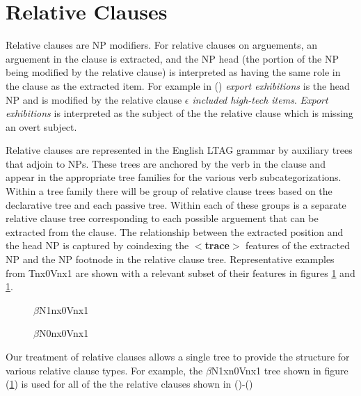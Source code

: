 \section{Relative Clauses}
\label{rel_clauses}

Relative clauses are NP modifiers. For relative clauses on arguements,
an arguement in the clause is extracted, and the NP head (the
portion of the NP being modified by the relative clause) is
interpreted as having the same role in the clause as the extracted
item.  For example in () {\it export exhibitions} is the head NP
and is modified by the relative clause {\it $\epsilon$ included high-tech
items}. {\it Export exhibitions} is interpreted as the subject of the
the relative clause which is missing an overt subject.


Relative clauses are represented in the English LTAG grammar by
auxiliary trees that adjoin to NPs. These trees are anchored by the
verb in the clause and appear in the appropriate tree families for the
various verb subcategorizations. Within a tree family there will be
group of relative clause trees based on the declarative tree and each
passive tree. Within each of these groups is a separate relative
clause tree corresponding to each possible arguement that can be
extracted from the clause. The relationship between the extracted
position and the head NP is captured by coindexing the {\bf
$<$trace$>$} features of the extracted NP and the NP footnode in the
relative clause tree.  Representative examples from
Tnx0Vnx1 are shown with a relevant subset
of their features in figures \ref{betaN1nx0Vnx1} and
\ref{betaN1nx0Vnx1}.

\begin{figure}[htbp]
\caption{ \label{betaN1nx0Vnx1} $\beta$N1nx0Vnx1}
\end{figure}

\begin{figure}[htbp]
\caption{ \label{betaN0nx0Vnx1} $\beta$N0nx0Vnx1}
\end{figure}


Our treatment of relative clauses allows a single tree to provide the
structure for various relative clause types. For example, the
$\beta$N1xn0Vnx1 tree shown in figure (\ref{betaN1nx0Vnx1}) is used
for all of the the relative clauses shown in ()-()
\vspace{0.5cm}

